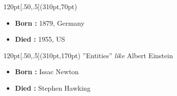 \begin{frame}
\begin{textblock*}{120pt}[.50,.5](310pt,70pt)
\begin{itemize} 
\item \textbf{Born :} 1879, Germany
\item \textbf{Died :} 1955, US
 \end{itemize}

\end{textblock*}

\begin{textblock*}{120pt}[.50,.5](310pt,170pt)
''Entities'' \emph{like} Albert Einstein
\begin{itemize} 
\item \textbf{Born :} Issac Newton
\item \textbf{Died :} Stephen Hawking
 \end{itemize}
\end{textblock*}

\end{frame}

